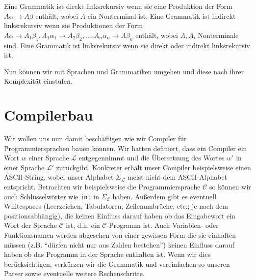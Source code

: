 \begin{defn}[Linksrekursiv]
Eine Grammatik ist direkt linksrekursiv wenn sie eine Produktion der Form $A\alpha \to A\beta$ enthält, wobei $A$ ein Nonterminal ist.
Eine Grammatik ist indirekt linksrekursiv wenn sie Produktionen der Form $A\alpha \to A_1\beta_1, A_1 \alpha_1 \to A_2\beta_2, \ldots, A_n \alpha_n \to A\beta_n$ enthält, wobei $A,A_i$ Nonterminale sind.
Eine Grammatik ist linksrekursiv wenn sie direkt oder indirekt linksrekursiv ist.
\end{defn}

Nun können wir mit Sprachen und Grammatiken umgehen und diese nach ihrer Komplexität einstufen.

\section{Compilerbau}
Wir wollen uns nun damit beschäftigen wie wir Compiler für Programmiersprachen bauen können.
Wir hatten definiert, dass ein Compiler ein Wort $w$ einer Sprache $\mathcal{L}$ entgegennimmt und
die Übersetzung des Wortes $w'$ in einer Sprache $\mathcal{L}'$ zurückgibt.
Konkreter erhält unser Compiler beispielsweise einen ASCII-String, wobei unser Alphabet $\Sigma_\mathcal{L}$ meist
nicht dem ASCII-Alphabet entspricht. Betrachten wir beispielsweise die Programmiersprache $\mathcal{C}$ so können wir
auch Schlüsselwörter wie \verb|int| in $\Sigma_\mathcal{C}$ haben.
Außerdem gibt es eventuell Whitespaces (Leerzeichen, Tabulatoren, Zeilenumbrüche, etc.; je nach dem positionsabhängig), die keinen Einfluss darauf haben ob das
Eingabewort ein Wort der Sprache $\mathcal{C}$ ist, d.h. ein $\mathcal{C}$-Programm ist. Auch Variablen- oder Funktionsnamen werden abgesehen von einer
gewissen Form die sie einhalten müssen (z.B. ``dürfen nicht nur aus Zahlen bestehen'') keinen Einfluss darauf haben ob das Programm in der Sprache enthalten ist.
Wenn wir dies berücksichtigen, verkürzen wir die Grammatik und vereinfachen so unseren Parser sowie eventuelle weitere Rechenschritte.

